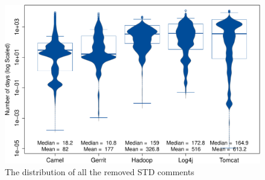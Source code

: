 
\begin{figure}[t]
	\centering
	\includegraphics[width=0.9\columnwidth]{figures/test/removed_all_STD_comments.pdf}
	\caption{The distribution of all the removed STD comments}
	\label{fig:removed_all_std_comments}
\end{figure}


